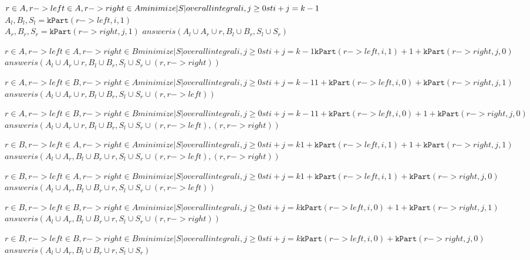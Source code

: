 \documentclass[11pt]{article}
\begin{document}
          $r \in A, r->left \in A, r->right \in A\\
              minimize |S| over all integral i,j \geq 0 st i+j = k-1$\\
                $A_l, B_l, S_l = \mathtt{kPart}(r->left,i,1)$\\
                $A_r, B_r, S_r = \mathtt{kPart}(r->right,j,1)$
                $answer is (A_l \cup A_r \cup {r},B_l \cup B_r,S_l \cup S_r)$

          $r \in A, r->left \in A, r->right \in B
              minimize |S| over all integral i,j \geq 0 st i+j = k-1
                    \mathtt{kPart}(r->left,i,1) + 1 + \mathtt{kPart}(r->right,j,0)$
                $answer is (A_l \cup A_r \cup {r},B_l \cup B_r,S_l \cup S_r \cup {(r, r->right)})$

          $r \in A, r->left \in B, r->right \in A
              minimize |S| over all integral i,j \geq 0 st i+j = k-1
                1 + \mathtt{kPart}(r->left,i,0) +     \mathtt{kPart}(r->right,j,1)$
                $answer is (A_l \cup A_r \cup {r},B_l \cup B_r,S_l \cup S_r \cup {(r, r->left)})$

          $r \in A, r->left \in B, r->right \in B
              minimize |S| over all integral i,j \geq 0 st i+j = k-1
                1 + \mathtt{kPart}(r->left,i,0) + 1 + \mathtt{kPart}(r->right,j,0)$
                $answer is (A_l \cup A_r \cup {r},B_l \cup B_r,S_l \cup S_r \cup {(r, r->left),(r, r->right)})$

          $r \in B, r->left \in A, r->right \in A
              minimize |S| over all integral i,j \geq 0 st i+j = k
                1 + \mathtt{kPart}(r->left,i,1) + 1 + \mathtt{kPart}(r->right,j,1)$
                $answer is (A_l \cup A_r,B_l \cup B_r \cup {r},S_l \cup S_r \cup {(r, r->left),(r, r->right)})$

          $r \in B, r->left \in A, r->right \in B
              minimize |S| over all integral i,j \geq 0 st i+j = k
                1 + \mathtt{kPart}(r->left,i,1) +     \mathtt{kPart}(r->right,j,0)$
                $answer is (A_l \cup A_r,B_l \cup B_r \cup {r},S_l \cup S_r \cup {(r, r->left)})$

          $r \in B, r->left \in B, r->right \in A
              minimize |S| over all integral i,j \geq 0 st i+j = k
                    \mathtt{kPart}(r->left,i,0) + 1 + \mathtt{kPart}(r->right,j,1)$
                $answer is (A_l \cup A_r,B_l \cup B_r \cup {r},S_l \cup S_r \cup {(r, r->right)})$

          $r \in B, r->left \in B, r->right \in B
              minimize |S| over all integral i,j \geq 0 st i+j = k
                    \mathtt{kPart}(r->left,i,0) +     \mathtt{kPart}(r->right,j,0)$
                $answer is (A_l \cup A_r,B_l \cup B_r \cup {r},S_l \cup S_r)$
\end{document}
